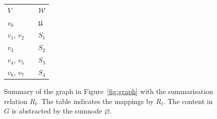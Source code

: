\begin{figure}
	\centering
	\begin{minipage}{.7\textwidth}
		\resizebox{\textwidth}{!}{
			
		}
	\end{minipage}
	\quad
	\begin{minipage}[h]{.25\textwidth}
		\centering
		\caption*{$R_t\left(V, \mathcal{W}\right)$}
		\begin{tabular}{lc@{\hs}l}
			\toprule
			$V$ & \phantom{a} & $\mathcal{W}$ \\
			\cmidrule{1-1} \cmidrule{3-3}
			$v_0$ & \phantom{a} & $\mathfrak{U}$ \\
			$v_1$, $v_2$ & \phantom{a} & $S_1$ \\
			$v_3$ & \phantom{a} & $S_2$ \\
			$v_4$, $v_5$ & \phantom{a} & $S_3$ \\
			$v_6$, $v_7$ & \phantom{a} & $S_4$ \\
			\bottomrule
		\end{tabular}
	\end{minipage}
	\caption[Types summary of a graph]{Summary of the graph in Figure~\ref{fig:graph} with the summarisation relation $R_t$. The table indicates the mappings by $R_t$. The content in $G$ is abstracted by the sumnode $\varnothing$.}
	\label{fig:classes-summary}
\end{figure}

%

